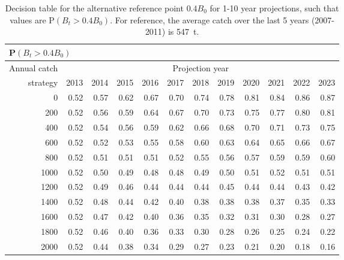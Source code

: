 \begin{table}[tbp]
\begin{center}
\caption{Decision table for the alternative reference point $0.4 B_0$ for 1-10 year projections, such that values are P$(B_t > 0.4 B_0)$. For reference, the average catch over the last 5 years (2007-2011) is 547~t.}
\label{tab:B00.4.10yr}
\begin{tabular}{rrrrrrrrrrrr}
\multicolumn{12}{l}{P$(B_t > 0.4 B_0)$} \\
\hline
Annual catch & \multicolumn{11}{c}{Projection year} \\
\cline{2-12}
strategy & 2013 & 2014 & 2015 & 2016 & 2017 & 2018 & 2019 & 2020 & 2021 & 2022 & 2023 \\ 
  \hline
0 & 0.52 & 0.57 & 0.62 & 0.67 & 0.70 & 0.74 & 0.78 & 0.81 & 0.84 & 0.86 & 0.87 \\ 
  200 & 0.52 & 0.56 & 0.59 & 0.64 & 0.67 & 0.70 & 0.73 & 0.75 & 0.77 & 0.80 & 0.81 \\ 
  400 & 0.52 & 0.54 & 0.56 & 0.59 & 0.62 & 0.66 & 0.68 & 0.70 & 0.71 & 0.73 & 0.75 \\ 
  600 & 0.52 & 0.52 & 0.53 & 0.55 & 0.58 & 0.60 & 0.63 & 0.64 & 0.65 & 0.66 & 0.67 \\ 
  800 & 0.52 & 0.51 & 0.51 & 0.51 & 0.52 & 0.55 & 0.56 & 0.57 & 0.59 & 0.59 & 0.60 \\ 
  1000 & 0.52 & 0.50 & 0.49 & 0.48 & 0.48 & 0.49 & 0.50 & 0.51 & 0.52 & 0.51 & 0.51 \\ 
  1200 & 0.52 & 0.49 & 0.46 & 0.44 & 0.44 & 0.44 & 0.45 & 0.44 & 0.44 & 0.43 & 0.42 \\ 
  1400 & 0.52 & 0.48 & 0.44 & 0.42 & 0.40 & 0.38 & 0.38 & 0.38 & 0.37 & 0.35 & 0.33 \\ 
  1600 & 0.52 & 0.47 & 0.42 & 0.40 & 0.36 & 0.35 & 0.32 & 0.31 & 0.30 & 0.28 & 0.27 \\ 
  1800 & 0.52 & 0.46 & 0.40 & 0.36 & 0.33 & 0.30 & 0.28 & 0.26 & 0.25 & 0.24 & 0.22 \\ 
  2000 & 0.52 & 0.44 & 0.38 & 0.34 & 0.29 & 0.27 & 0.23 & 0.21 & 0.20 & 0.18 & 0.16 \\ 
   \hline
\end{tabular}
\end{center}
\end{table}


